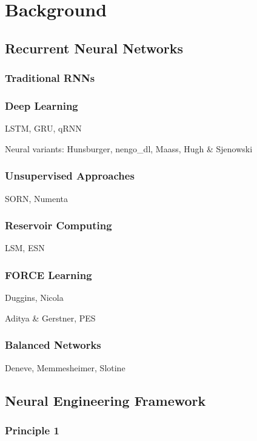 \chapter{Background}
\label{chapt:background}

\section{Recurrent Neural Networks}

\subsection{Traditional RNNs}

\subsection{Deep Learning}

LSTM, GRU, qRNN

Neural variants: Hunsburger, nengo\_dl, Maass, Hugh \& Sjenowski

\subsection{Unsupervised Approaches}

SORN, Numenta

\subsection{Reservoir Computing}

LSM, ESN

\subsection{FORCE Learning}

Duggins, Nicola

Aditya \& Gerstner, PES

\subsection{Balanced Networks}

Deneve, Memmesheimer, Slotine


\section{Neural Engineering Framework}

\subsection{Principle 1}

